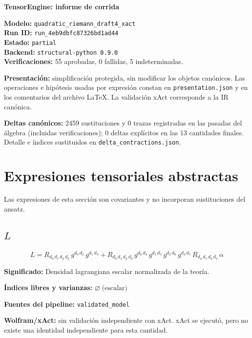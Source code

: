 \documentclass[11pt]{article}
\begin{document}
\begin{center}
{\Large\bfseries TensorEngine: informe de corrida}
\end{center}
\textbf{Modelo:} \texttt{quadratic\_riemann\_draft4\_xact}\\
\textbf{Run ID:} \texttt{run\_4eb9dbfc87326bd1ad44}\\
\textbf{Estado:} \texttt{partial}\\
\textbf{Backend:} \texttt{structural-python 0.9.0}\\
\textbf{Verificaciones:} 55 aprobadas, 0 fallidas, 5 indeterminadas.
\par\smallskip
\textbf{Presentación:} simplificación protegida, sin modificar los objetos canónicos. Las operaciones e hipótesis usadas por expresión constan en \texttt{presentation.json} y en los comentarios del archivo LaTeX. La validación xAct corresponde a la IR canónica.\par
\textbf{Deltas canónicos:} 2459 sustituciones y 0 trazas registradas en las pasadas del álgebra (incluidas verificaciones); 0 deltas explícitos en las 13 cantidades finales. Detalle e índices sustituidos en \texttt{delta\_contractions.json}.\par
\section*{Expresiones tensoriales abstractas}
Las expresiones de esta sección son covariantes y no incorporan sustituciones del ansatz.
\subsection*{$ L $}
\begin{dmath*}[breakdepth={5}]
L = R{}_{d_{0}\,d_{1}\,d_{2}\,d_{3}}\,g{}^{d_{0}\,d_{2}}\,g{}^{d_{1}\,d_{3}} + R{}_{d_{0}\,d_{1}\,d_{2}\,d_{3}}\,g{}^{d_{0}\,d_{4}}\,g{}^{d_{1}\,d_{5}}\,g{}^{d_{2}\,d_{6}}\,g{}^{d_{3}\,d_{7}}\,R{}_{d_{4}\,d_{5}\,d_{6}\,d_{7}}\,\alpha
\end{dmath*}
\par\vspace{1.2\baselineskip}\noindent
\begin{minipage}{\linewidth}
\textbf{Significado:} Densidad lagrangiana escalar normalizada de la teoría.\par
\textbf{Índices libres y varianzas:} $ \varnothing\;\text{(escalar)} $\par
\textbf{Fuentes del pipeline:} \texttt{validated\_model}\par
\textbf{Wolfram/xAct:} sin validación independiente con xAct. xAct se ejecutó, pero no existe una identidad independiente para esta cantidad.\par
\end{minipage}
\end{document}
